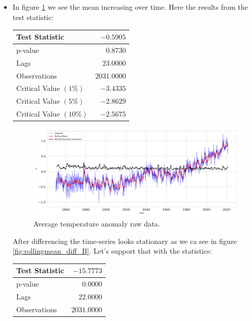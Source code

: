 \documentclass[]{article}
\begin{document}
	\subsection{}
	\begin{itemize}
		\item In figure \ref{fig:rollingmean_B} we see the mean increasing over time. Here the results from the test statistic:
		\begin{center}
			\begin{tabular}{|l|r|}
				\hline Test Statistic & $-0.5905$ \\
				\hline p-value & $0.8730$ \\
				\hline Lags & $23.0000$ \\
				\hline Observations & $2031.0000$ \\
				\hline Critical Value $(1 \%)$ & $-3.4335$ \\
				\hline Critical Value $(5 \%)$ & $-2.8629$ \\
				\hline Critical Value $(10 \%)$ & $-2.5675$ \\
				\hline
			\end{tabular}
		\end{center}
		\begin{figure}
			\centering
			\includegraphics[width=1\textwidth]{images/ts_moving_avg_B.png}
			\caption{Average temperature anomaly raw data.}
			\label{fig:rollingmean_B}
		\end{figure}
		After differencing the time-series looks stationary as we ca see in figure \ref{fig:rollingmean_diff_B}. Let's support that with the statistics:
		\begin{center}
			\begin{tabular}{|l|r|}
				\hline Test Statistic & $-15.7773$ \\
				\hline p-value & $0.0000$ \\
				\hline Lags & $22.0000$ \\
				\hline Observations & $2031.0000$ \\

\end{tabular}
\end{center}
\end{itemize}
\end{document}
